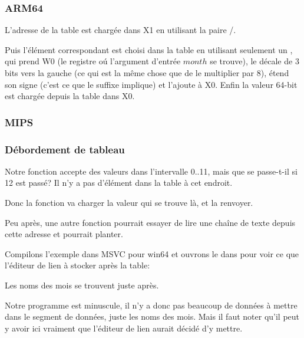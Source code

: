 \subsubsection{ARM64}




L'adresse de la table est chargée dans X1 en utilisant la paire \ADRP/\ADD.

Puis l'élément correspondant est choisi dans la table en utilisant seulement un \LDR,
qui prend W0 (le registre oú l'argument d'entrée $month$ se trouve), le décale de
3 bits vers la gauche (ce qui est la même chose que de le multiplier par 8), étend
son signe (c'est ce que le suffixe  implique) et l'ajoute à X0.
Enfin la valeur 64-bit est chargée depuis la table dans X0.

\subsubsection{MIPS}



\subsubsection{Débordement de tableau}

Notre fonction accepte des valeurs dans l'intervalle 0..11, mais que se passe-t-il
si 12 est passé?
Il n'y a pas d'élément dans la table à cet endroit.

Donc la fonction va charger la valeur qui se trouve là, et la renvoyer.

Peu après, une autre fonction pourrait essayer de lire une chaîne de texte depuis
cette adresse et pourrait planter.

Compilons l'exemple dans MSVC pour win64 et ouvrons le dans \IDA pour voir ce que
l'éditeur de lien à stocker après la table:



Les noms des mois se trouvent juste après.

Notre programme est minuscule, il n'y a donc pas beaucoup de données à mettre dans
le segment de données, juste les noms des mois.
Mais il faut noter qu'il peut y avoir ici vraiment  que l'éditeur
de lien aurait décidé d'y mettre.

